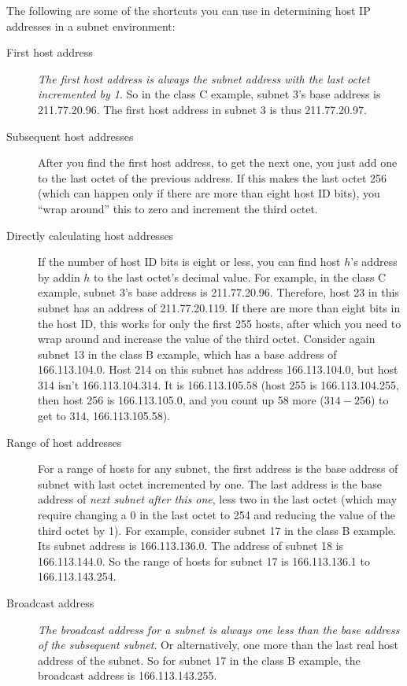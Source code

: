 The following are some of the shortcuts you can use in determining host
IP addresses in a subnet environment:
\begin{description}
   \item[First host address]
      \emph{The first host address is always the subnet address with the last octet incremented by 1}.
      So in the class C example, subnet 3's base address is 211.77.20.96.
      The first host address in subnet 3 is thus 211.77.20.97.

   \item[Subsequent host addresses]
      After you find the first host address, to get the next one, you just add one to the last octet of the previous address.
      If this makes the last octet 256 (which can happen only if there are more than eight host ID bits),
      you ``wrap around'' this to zero and increment the third octet.

   \item[Directly calculating host addresses]
      If the number of host ID bits is eight or less, you can find host $h$'s address by addin $h$ to the last octet's decimal value.
      For example, in the class C example, subnet 3's base address is 211.77.20.96.
      Therefore, host 23 in this subnet has an address of 211.77.20.119.
      If there are more than eight bits in the host ID, this works for only the first 255 hosts,
      after which you need to wrap around and increase the value of the third octet.
      Consider again subnet 13 in the class B example, which has a base address of 166.113.104.0.
      Host 214 on this subnet has address 166.113.104.0, but host 314 isn't 166.113.104.314.
      It is 166.113.105.58 (host 255 is 166.113.104.255, then host 256 is 166.113.105.0, and you count up 58 more ($314-256$) to get to 314, 166.113.105.58).

   \item[Range of host addresses]
      For a range of hosts for any subnet, the first address is the base address of subnet with last octet incremented by one.
      The last address is the base address of \emph{next subnet after this one}, less two in the last octet
      (which may require changing a 0 in the last octet to 254 and reducing the value of the third octet by 1).
      For example, consider subnet 17 in the class B example.
      Its subnet address is 166.113.136.0.
      The address of subnet 18 is 166.113.144.0.
      So the range of hosts for subnet 17 is 166.113.136.1 to 166.113.143.254.

   \item[Broadcast address]
      \emph{The broadcast address for a subnet is always one less than the base address of the subsequent subnet}.
      Or alternatively, one more than the last real host address of the subnet.
      So for subnet 17 in the class B example, the broadcast address is 166.113.143.255.
\end{description}

